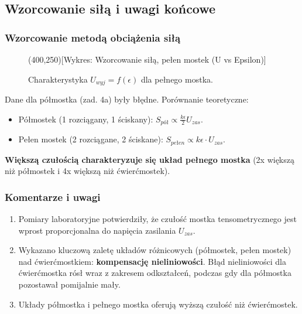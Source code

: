 \documentclass[12pt, a4paper]{article}
\begin{document}
	\subsection{Wzorcowanie siłą i uwagi końcowe}
	
	\subsubsection{Wzorcowanie metodą obciążenia siłą}
	
	\begin{figure}[H]
		\centering
		\framebox(400,250){[Wykres: Wzorcowanie siłą, pełen mostek (U vs Epsilon)]}
		\caption{Charakterystyka $U_{wyj} = f(\epsilon)$ dla pełnego mostka.}
	\end{figure}
	
	Dane dla półmostka (zad. 4a) były błędne. Porównanie teoretyczne:
	\begin{itemize}
		 \item Półmostek (1 rozciągany, 1 ściskany): $S_{pół} \propto \frac{k\epsilon}{2} U_{zas}$.
		 \item Pełen mostek (2 rozciągane, 2 ściskane): $S_{pełen} \propto k\epsilon \cdot U_{zas}$.
	\end{itemize}
	\textbf{Większą czułością charakteryzuje się układ pełnego mostka} (2x większą niż półmostek i 4x większą niż ćwierćmostek).
	
	\subsubsection{Komentarze i uwagi}
	\begin{enumerate}
		\item Pomiary laboratoryjne potwierdziły, że czułość mostka tensometrycznego jest wprost proporcjonalna do napięcia zasilania $U_{zas}$.
		\item Wykazano kluczową zaletę układów różnicowych (półmostek, pełen mostek) nad ćwierćmostkiem: \textbf{kompensację nieliniowości}.  Błąd nieliniowości dla ćwierćmostka rósł wraz z zakresem odkształceń, podczas gdy dla półmostka pozostawał pomijalnie mały.
		\item Układy półmostka i pełnego mostka oferują wyższą czułość niż ćwierćmostek.
	\end{enumerate}
	
\end{document}
